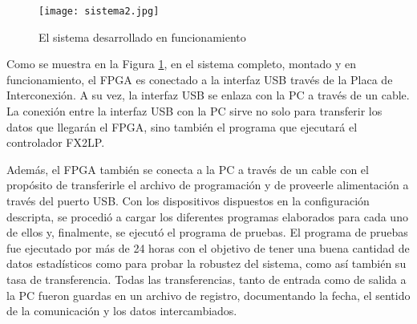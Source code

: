 \begin{figure}[ht]
	\centering
	\texttt{[image: sistema2.jpg]}
	\caption{El sistema desarrollado en funcionamiento}
	\label{test:todo}
\end{figure}

Como se muestra en la Figura \ref{test:todo}, en el sistema completo, montado y en funcionamiento, el FPGA es conectado a la interfaz USB través de la Placa de Interconexión. A su vez, la interfaz USB se enlaza con la PC a través de un cable. La conexión entre la interfaz USB con la PC sirve no solo para transferir los datos que llegarán el FPGA, sino también el programa que ejecutará el controlador FX2LP.

Además, el FPGA también se conecta a la PC a través de un cable con el propósito de transferirle el archivo de programación y de proveerle alimentación a través del puerto USB.
Con los dispositivos dispuestos en la configuración descripta, se procedió a cargar los diferentes programas elaborados para cada uno de ellos y, finalmente, se ejecutó el programa de pruebas.
El programa de pruebas fue ejecutado por más de 24 horas con el objetivo de tener una buena cantidad de datos estadísticos como para probar la robustez del sistema, como así también su tasa de transferencia.
Todas las transferencias, tanto de entrada como de salida a la PC fueron guardas en un archivo de registro, documentando la fecha, el sentido de la comunicación y los datos intercambiados. 